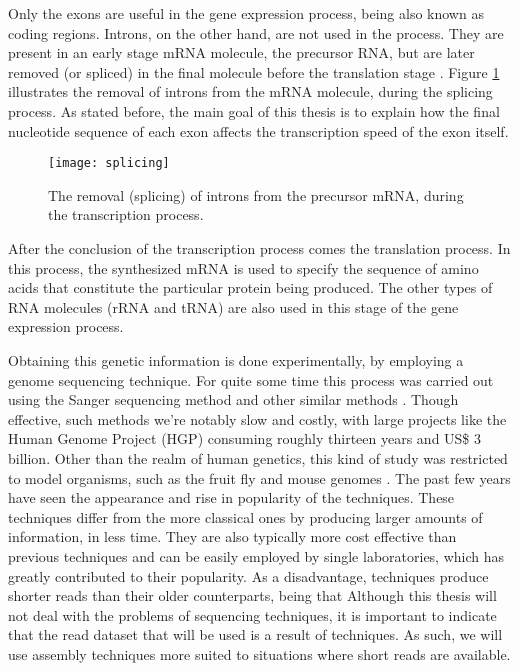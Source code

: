 Only the exons are useful in the gene expression process, being also known as
coding regions. Introns, on the other hand, are not used in the process. They
are present in an early stage mRNA molecule, the precursor RNA, but are later
removed (or spliced) in the final molecule before the translation stage
\cite{leic:gene_expr}. Figure \ref{fig:splicing} illustrates the removal of
introns from the mRNA molecule, during the  splicing process. As stated before,
the main goal of this thesis is to explain how the final nucleotide sequence of
each exon affects the transcription speed of the exon itself.

\begin{figure}[!htb]
  \begin{center}
    \leavevmode
    \texttt{[image: splicing]}
    \caption[Removal of introns from precursor mRNA]{The removal (splicing) of introns from the precursor mRNA, during
    the transcription process.}
    \label{fig:splicing}
  \end{center}
\end{figure}

After the conclusion of the transcription process comes the translation process.
In this process, the synthesized mRNA is used to specify the sequence of amino
acids that constitute the particular protein being produced. The other types of
RNA molecules (rRNA and tRNA) are also used in this stage of the gene expression
process.

Obtaining this genetic information is done experimentally, by employing a genome
sequencing technique. For quite some time this process was carried out using the
Sanger sequencing method and other similar methods \cite{Reis-Filho2009}. Though
effective, such methods we're notably slow and costly, with large projects like
the Human Genome Project (HGP) consuming roughly thirteen years and US\$ 3
billion. Other than the realm of human genetics, this kind of study was
restricted to model organisms, such as the fruit fly and mouse genomes
\cite{Wolf2013}. The past few years have seen the appearance and rise in
popularity of the \ngs{} techniques. These techniques differ from the more
classical ones by producing larger amounts of information, in less time. They
are also typically more cost effective than previous techniques and can be
easily employed by single laboratories, which has greatly contributed to their
popularity. As a disadvantage, \ngs{} techniques produce shorter reads than
their older counterparts, being that 
\cite[p. 671]{Martin2011} Although this thesis will not deal with the problems
of sequencing techniques, it is important to indicate that the read dataset that
will be used is a result of \ngs{} techniques. As such, we will use assembly
techniques more suited to situations where short reads are available.

